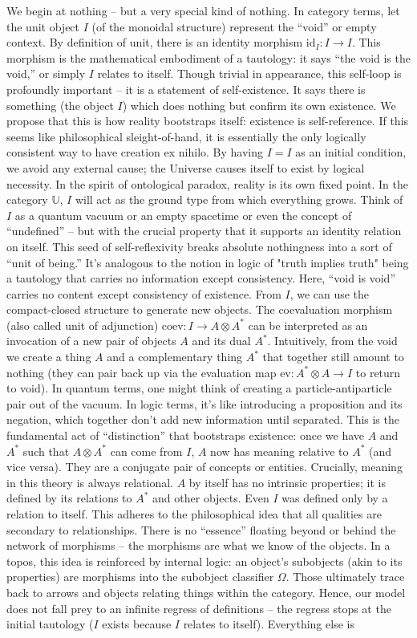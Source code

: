 \documentclass{article}
\begin{document}
We begin at nothing – but a very special kind of nothing. In category terms, let the unit object $I$ (of the monoidal structure) represent the “void” or empty context. By definition of unit, there is an identity morphism $\mathrm{id}_I: I \to I$. This morphism is the mathematical embodiment of a tautology: it says “the void is the void,” or simply $I$ relates to itself. Though trivial in appearance, this self-loop is profoundly important – it is a statement of self-existence. It says there is something (the object $I$) which does nothing but confirm its own existence. We propose that this is how reality bootstraps itself: existence is self-reference. If this seems like philosophical sleight-of-hand, it is essentially the only logically consistent way to have creation ex nihilo. By having $I = I$ as an initial condition, we avoid any external cause; the Universe causes itself to exist by logical necessity. In the spirit of ontological paradox, reality is its own fixed point. In the category $\mathbb{U}$, $I$ will act as the ground type from which everything grows. Think of $I$ as a quantum vacuum or an empty spacetime or even the concept of “undefined” – but with the crucial property that it supports an identity relation on itself. This seed of self-reflexivity breaks absolute nothingness into a sort of “unit of being.” It’s analogous to the notion in logic of "truth implies truth" being a tautology that carries no information except consistency. Here, “void is void” carries no content except consistency of existence. From $I$, we can use the compact-closed structure to generate new objects. The coevaluation morphism (also called unit of adjunction) $\text{coev}: I \to A \otimes A^*$ can be interpreted as an invocation of a new pair of objects $A$ and its dual $A^*$. Intuitively, from the void we create a thing $A$ and a complementary thing $A^*$ that together still amount to nothing (they can pair back up via the evaluation map $\text{ev}: A^* \otimes A \to I$ to return to void). In quantum terms, one might think of creating a particle-antiparticle pair out of the vacuum. In logic terms, it’s like introducing a proposition and its negation, which together don’t add new information until separated. This is the fundamental act of “distinction” that bootstraps existence: once we have $A$ and $A^*$ such that $A \otimes A^*$ can come from $I$, $A$ now has meaning relative to $A^*$ (and vice versa). They are a conjugate pair of concepts or entities. Crucially, meaning in this theory is always relational. $A$ by itself has no intrinsic properties; it is defined by its relations to $A^*$ and other objects. Even $I$ was defined only by a relation to itself. This adheres to the philosophical idea that all qualities are secondary to relationships. There is no “essence” floating beyond or behind the network of morphisms – the morphisms are what we know of the objects. In a topos, this idea is reinforced by internal logic: an object’s subobjects (akin to its properties) are morphisms into the subobject classifier $\Omega$. Those ultimately trace back to arrows and objects relating things within the category. Hence, our model does not fall prey to an infinite regress of definitions – the regress stops at the initial tautology ($I$ exists because $I$ relates to itself). Everything else is 
\end{document}
